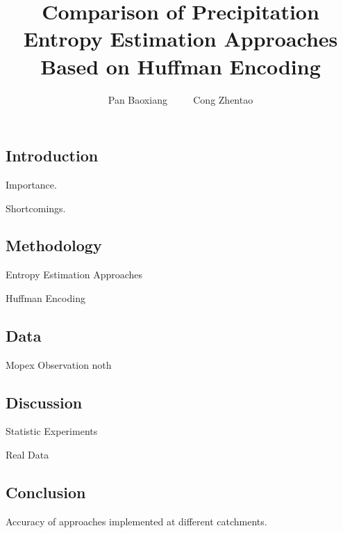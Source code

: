 \documentclass[11pt]{article}
\begin{document}

\title{Comparison of Precipitation Entropy Estimation Approaches Based on Huffman Encoding}
\date{ }
\author{Pan Baoxiang ~~~~ Cong Zhentao}
\maketitle

\newpage
\begin{abstract}
\end{abstract}
 


\newpage
\begin{center}
\tableofcontents
\end{center}

\newpage

\begin{center}
\section{Introduction}
\end{center}

 
Importance.

Shortcomings.
 
 

\newpage 
\begin{center}
\section{Methodology}
\end{center}

Entropy Estimation Approaches

Huffman Encoding
\newpage
\begin{center}
\section{Data}
\end{center}

Mopex Observation
noth
\newpage
\begin{center}
\section{Discussion}
\end{center}

Statistic Experiments

Real Data
\newpage
\begin{center}
\section{Conclusion}
\end{center}
 
Accuracy of approaches implemented at different catchments.



\newpage
\begin{center}

\end{center}
\end{document}

